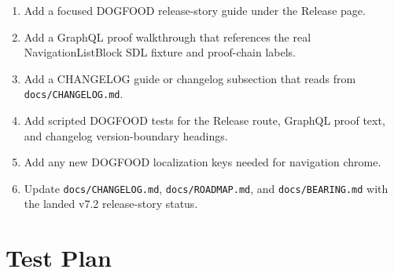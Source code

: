 \begin{enumerate}
\def\labelenumi{\arabic{enumi}.}
\tightlist
\item
  Add a focused DOGFOOD release-story guide under the Release page.
\item
  Add a GraphQL proof walkthrough that references the real NavigationListBlock SDL fixture and proof-chain labels.
\item
  Add a CHANGELOG guide or changelog subsection that reads from \texttt{d\allowbreak{}o\allowbreak{}c\allowbreak{}s\allowbreak{}/\allowbreak{}C\allowbreak{}H\allowbreak{}A\allowbreak{}N\allowbreak{}G\allowbreak{}E\allowbreak{}L\allowbreak{}O\allowbreak{}G\allowbreak{}.\allowbreak{}m\allowbreak{}d}.
\item
  Add scripted DOGFOOD tests for the Release route, GraphQL proof text, and changelog version-boundary headings.
\item
  Add any new DOGFOOD localization keys needed for navigation chrome.
\item
  Update \texttt{d\allowbreak{}o\allowbreak{}c\allowbreak{}s\allowbreak{}/\allowbreak{}C\allowbreak{}H\allowbreak{}A\allowbreak{}N\allowbreak{}G\allowbreak{}E\allowbreak{}L\allowbreak{}O\allowbreak{}G\allowbreak{}.\allowbreak{}m\allowbreak{}d}, \texttt{d\allowbreak{}o\allowbreak{}c\allowbreak{}s\allowbreak{}/\allowbreak{}R\allowbreak{}O\allowbreak{}A\allowbreak{}D\allowbreak{}M\allowbreak{}A\allowbreak{}P\allowbreak{}.\allowbreak{}m\allowbreak{}d}, and \texttt{d\allowbreak{}o\allowbreak{}c\allowbreak{}s\allowbreak{}/\allowbreak{}B\allowbreak{}E\allowbreak{}A\allowbreak{}R\allowbreak{}I\allowbreak{}N\allowbreak{}G\allowbreak{}.\allowbreak{}m\allowbreak{}d} with the landed v7.2 release-story status.
\end{enumerate}

\section{Test Plan}\label{record-118-test-plan}

